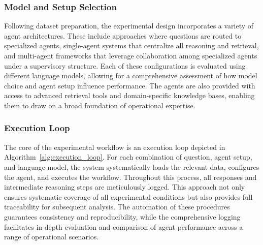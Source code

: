             \subsubsection{Model and Setup Selection}

                Following dataset preparation, the experimental design incorporates a variety of agent architectures. These include approaches where questions are routed to specialized agents, single-agent systems that centralize all reasoning and retrieval, and multi-agent frameworks that leverage collaboration among specialized agents under a supervisory structure. Each of these configurations is evaluated using different language models, allowing for a comprehensive assessment of how model choice and agent setup influence performance. The agents are also provided with access to advanced retrieval tools and domain-specific knowledge bases, enabling them to draw on a broad foundation of operational expertise.

            \subsubsection{Execution Loop}

                The core of the experimental workflow is an execution loop depicted in Algorithm~\ref{alg:execution_loop}. For each combination of question, agent setup, and language model, the system systematically loads the relevant data, configures the agent, and executes the workflow. Throughout this process, all responses and intermediate reasoning steps are meticulously logged. This approach not only ensures systematic coverage of all experimental conditions but also provides full traceability for subsequent analysis. The automation of these procedures guarantees consistency and reproducibility, while the comprehensive logging facilitates in-depth evaluation and comparison of agent performance across a range of operational scenarios.

